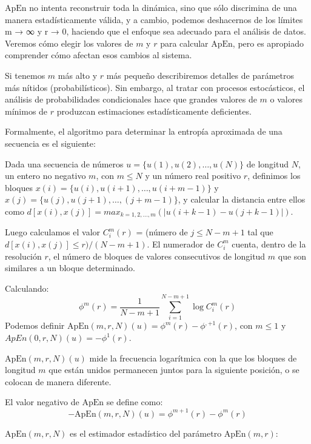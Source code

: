\documentclass[a4paper,12pt]{article}
\begin{document}
$\textrm{ApEn}$ no intenta reconstruir toda la dinámica, sino que sólo discrimina de una manera estadísticamente válida, y a cambio, podemos deshacernos de los límites m → ∞ y r → 0, haciendo que el enfoque sea adecuado para el análisis de datos. Veremos cómo elegir los valores de $m$  y $r$ para calcular $\textrm{ApEn}$, pero es apropiado comprender cómo afectan esos cambios al sistema. 

Si tenemos $m$ más alto y $r$ más pequeño describiremos detalles de parámetros más nítidos (probabilísticos). Sin embargo, al tratar con procesos estocásticos, el análisis de probabilidades condicionales hace que grandes valores de $m$ o valores mínimos de $r$ produzcan estimaciones estadísticamente deficientes.

Formalmente, el algoritmo para determinar la entropía aproximada de una secuencia es el siguiente:

Dada una secuencia de números $u = \{u(1), u(2), \dots, u( N)\}$ de longitud $N$, un entero no negativo $m$, con $m \leq N$ y un número real positivo $r$, definimos los bloques $x(i) = \{u(i), u(i + 1), \dots, u(i + m - 1)\}$ y $x(j) = \{u(j), u(j+1), \dots, (j + m - 1)\}$, y calcular la distancia entre ellos como $d[x(i), x(j)] = max_{k=1,2, \dots,m}(|u(i + k - 1) - u( j + k - 1)|)$. 

Luego calculamos el valor $C_i^m (r)$ = (número de $j \leq N - m + 1$ tal que $d[x(i), x(j)] \leq r)/(N - m + 1)$. El numerador de $C_i^m$ cuenta, dentro de la resolución $r$, el número de bloques de valores consecutivos de longitud $m$ que son similares a un bloque determinado. 

Calculando: 
\begin{equation}\label{eqn:apen_1}
\phi^m(r) = \frac{1}{N-m+1} \sum_{i=1}^{N-m+1} \log C_i^m(r)
\end{equation}
Podemos definir $\textrm{ApEn}(m, r, N )(u) = \phi^m(r) - \phi^{,+1}(r)$, con $m \leq 1$ y $ApEn(0, r, N )(u) = −\phi^1 (r)$. 

$\textrm{ApEn}(m, r, N )(u)$ mide la frecuencia logarítmica con la que los bloques de longitud $m$ que están unidos permanecen juntos para la siguiente posición, o se colocan de manera diferente.

El valor negativo de $\textrm{ApEn}$ se define como:
\begin{equation}\label{eqn:apen_2}
-\textrm{ApEn}(m, r, N )(u) = \phi^{m+1}(r) - \phi^m(r)
\end{equation}

$\textrm{ApEn}(m,r,N)$ es el estimador estadístico del parámetro $\textrm{ApEn}(m,r)$:
\end{document}

